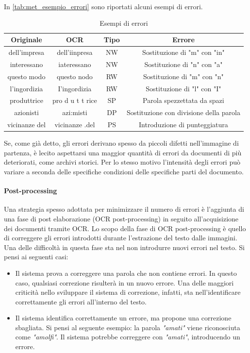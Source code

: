In \autoref{tab:met_esempio_errori} sono riportati alcuni esempi di errori.

\begin{table}[H]
\centering
\begin{tabular}{cccc}
\textbf{Originale} & \textbf{OCR} & \textbf{Tipo} & \textbf{Errore} \\ \hline
dell'impresa & dell’iinpresa 	& NW & Sostituzione di "m" con "in" \\
interessano & iateressano 		& NW & Sostituzione di "n" con "a" \\
questo modo & questo nodo 		& RW & Sostituzione di "m" con "n" \\
l'ingordizia & I’ingordizia 	& RW & Sostituzione di "l" con "I" \\
produttrice & pro d u t t rice 	& SP & Parola spezzettata da spazi \\
azionisti & azi:misti 			& DP & Sostituzione con divisione della parola \\
vicinanze  del & vicinanze .del & PS & Introduzione di punteggiatura\\

\end{tabular}
\caption{Esempi di errori}
\label{tab:met_esempio_errori}
\end{table}

Se, come già detto, gli errori derivano spesso da piccoli difetti nell'immagine di partenza, è lecito aspettarsi una maggior quantità di errori da documenti di più deteriorati, come archivi storici. Per lo stesso motivo l'intensità degli errori può variare a seconda delle specifiche condizioni delle specifiche parti del documento.

\paragraph{Post-processing}
Una strategia spesso adottata per minimizzare il numero di errori è l'aggiunta di
una fase di post elaborazione (OCR post-processing) in seguito all'acquisizione
dei documenti tramite OCR. Lo scopo della fase di OCR post-processing è quello di correggere gli errori introdotti durante l'estrazione del testo dalle immagini. Una delle difficoltà in questa fase sta nel non introdurre nuovi errori nel testo. Si pensi ai seguenti casi:
\begin{itemize}
\item Il sistema prova a correggere una parola che non contiene errori. In questo caso, qualsiasi correzione risulterà in un nuovo errore. Una delle maggiori criticità nello sviluppare il sistema di correzione, infatti, sta nell'identificare correttamente gli errori all'interno del testo.
\item Il sistema identifica correttamente un errore, ma propone una correzione sbagliata. Si pensi al seguente esempio: la parola \textit{"amati"} viene riconosciuta come \textit{"amolfi"}. Il sistema potrebbe correggere con \textit{"amati"}, introducendo un errore.
\end{itemize}

